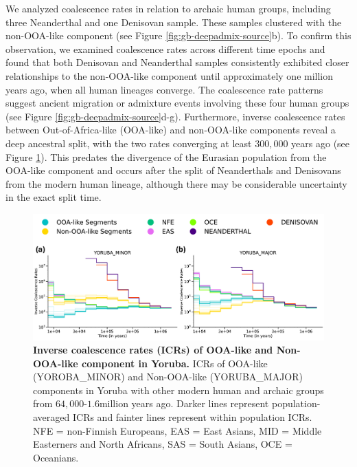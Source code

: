 We analyzed coalescence rates in relation to archaic human groups, including three Neanderthal and one Denisovan sample. These samples clustered with the non-OOA-like component (see Figure \ref{fig:gb-deepadmix-source}b). To confirm this observation, we examined coalescence rates across different time epochs and found that both Denisovan and Neanderthal samples consistently exhibited closer relationships to the non-OOA-like component until approximately one million years ago, when all human lineages converge. The coalescence rate patterns suggest ancient migration or admixture events involving these four human groups (see Figure \ref{fig:gb-deepadmix-source}d-g). Furthermore, inverse coalescence rates between Out-of-Africa-like (OOA-like) and non-OOA-like components reveal a deep ancestral split, with the two rates converging at least $300{,}000$ years ago (see Figure \ref{fig:gb_real_deep_coal_ooa}). This predates the divergence of the Eurasian population from the OOA-like component and occurs after the split of Neanderthals and Denisovans from the modern human lineage, although there may be considerable uncertainty in the exact split time.

\begin{figure}
    \centering
    \includegraphics[width=\textwidth]{figures/gb_deepadmix/gb_real_deep_source_coal_rates.pdf}
    \caption{
    \textbf{Inverse coalescence rates (ICRs) of OOA-like and Non-OOA-like component in Yoruba.} ICRs of OOA-like (YOROBA\_MINOR) and Non-OOA-like (YORUBA\_MAJOR) components in Yoruba with other modern human and archaic groups from $64{,}000$-$1.6$million years ago. Darker lines represent population-averaged ICRs and fainter lines represent within population ICRs. NFE = non-Finnish Europeans, EAS = East Asians, MID = Middle Easterners and North Africans, SAS = South Asians, OCE = Oceanians.}
\label{fig:gb_real_deep_coal_ooa}
\end{figure}



